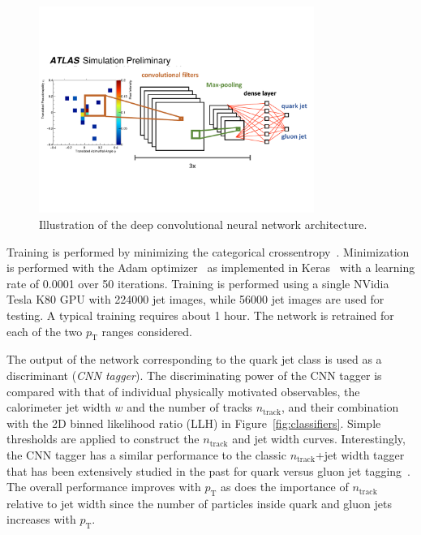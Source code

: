 \begin{figure}[htpb]
\begin{center}
\includegraphics[width=0.8\textwidth]{figures/CNN/network.pdf}
\caption{Illustration of the deep convolutional neural network architecture.}
\label{fig:networkarch}
\end{center}
\end{figure}

Training is performed by minimizing the categorical crossentropy~\cite{Goodfellow-et-al-2016-Book}.
Minimization is performed with the Adam optimizer~\cite{DBLP:journals/corr/KingmaB14} 
as implemented in Keras~\cite{chollet2015keras} 
with a learning rate of 0.0001 over 50 iterations.
Training is performed using a single NVidia Tesla K80 GPU with 224000 jet images, while 56000 jet images are used for testing.
A typical training requires about 1 hour.
The network is retrained for each of the two $p_\text{T}$ ranges considered.

The output of the network corresponding to the quark jet class is used as a discriminant (\textit{CNN tagger}).
The discriminating power of the CNN tagger is compared with that of individual physically motivated observables, the calorimeter jet width $w$ and the number of tracks $n_\text{track}$, and their combination with the 2D binned likelihood ratio (LLH) in Figure~\ref{fig:classifiers}.  Simple thresholds are applied to construct the $n_\text{track}$ and jet width curves.  Interestingly, the CNN tagger has a similar performance to the classic $n_\text{track}$+jet width tagger that has been extensively studied in the past for quark versus gluon jet tagging~\cite{Aad:2014gea,ATLAS-CONF-2016-034}.  
The overall performance improves with $p_\text{T}$ as does the importance of $n_\text{track}$ relative to jet width since the number of particles inside quark and gluon jets increases with $p_\text{T}$.

